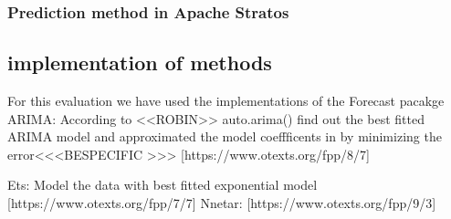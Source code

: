 \subsubsection{Prediction method in Apache Stratos}



\subsection{implementation of methods}
For this evaluation we have used the implementations of the Forecast pacakge \cite{forecastPackage}
ARIMA: According to <<ROBIN>> auto.arima()  find out the best fitted ARIMA model and approximated the model coeffficents in by minimizing the error<<<BESPECIFIC >>> [https://www.otexts.org/fpp/8/7]

Ets: Model the data with best fitted exponential model [https://www.otexts.org/fpp/7/7]
    \cite{Wagner_2011}
	Nnetar: [https://www.otexts.org/fpp/9/3]
